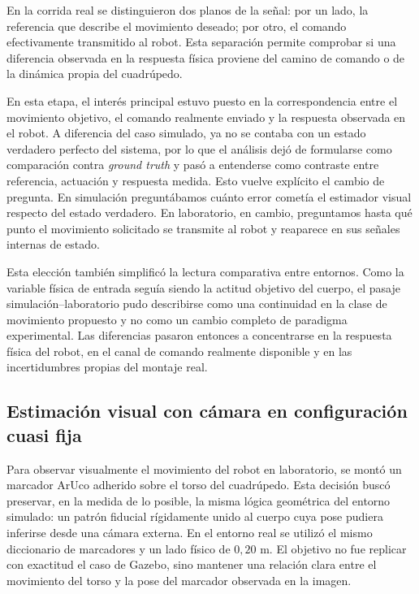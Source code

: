 \documentclass[12pt,a4paper]{report}
\begin{document}
En la corrida real se distinguieron dos planos de la señal: por un lado, la
referencia que describe el movimiento deseado; por otro, el comando
efectivamente transmitido al robot. Esta separación permite comprobar si una
diferencia observada en la respuesta física proviene del camino de comando o de
la dinámica propia del cuadrúpedo.

En esta etapa, el interés principal estuvo puesto en la correspondencia entre el
movimiento objetivo, el comando realmente enviado y la respuesta observada en el
robot. A diferencia del caso simulado, ya no se contaba con un estado verdadero
perfecto del sistema, por lo que el análisis dejó de formularse como comparación
contra \textit{ground truth} y pasó a entenderse como contraste entre referencia,
actuación y respuesta medida. Esto vuelve explícito el cambio de pregunta. En
simulación preguntábamos cuánto error
cometía el estimador visual respecto del estado verdadero. En laboratorio, en
cambio, preguntamos hasta qué punto el movimiento solicitado se transmite al
robot y reaparece en sus señales internas de estado.

Esta elección también simplificó la lectura comparativa entre entornos. Como la
variable física de entrada seguía siendo la actitud objetivo del cuerpo, el
pasaje simulación--laboratorio pudo describirse como una continuidad en la clase
de movimiento propuesto y no como un cambio completo de paradigma experimental.
Las diferencias pasaron entonces a concentrarse en la respuesta física del
robot, en el canal de comando realmente disponible y en las incertidumbres
propias del montaje real.

\subsection{Estimación visual con cámara en configuración cuasi fija}

Para observar visualmente el movimiento del robot en laboratorio, se montó un
marcador ArUco adherido sobre el torso del cuadrúpedo. Esta decisión buscó
preservar, en la medida de lo posible, la misma lógica geométrica del entorno
simulado: un patrón fiducial rígidamente unido al cuerpo cuya pose pudiera
inferirse desde una cámara externa. En el entorno real se utilizó el mismo
diccionario de marcadores y un lado físico de \(0{,}20\) m. El objetivo no fue
replicar con exactitud el caso de Gazebo, sino mantener una relación clara entre
el movimiento del torso y la pose del marcador observada en la imagen.
\end{document}
